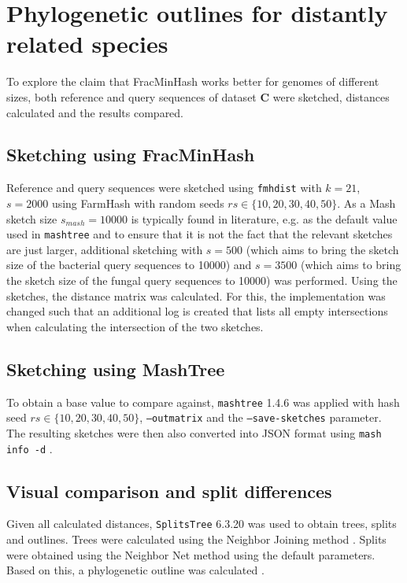 \section{Phylogenetic outlines for distantly related species}
To explore the claim that FracMinHash works better for genomes of different
sizes, both reference and query sequences of dataset \textbf{C} were sketched,
distances
calculated and the results compared. 

\subsection*{Sketching using FracMinHash}
\label{sec:intersectionlog}
Reference and query sequences were sketched using \texttt{fmhdist} with $k=21$,
$s=2000$ using FarmHash \cite{pikeFarmhash2014,ZeroAllocationHashing2022} with
random seeds $rs \in \{10, 20, 30, 40, 50\}$. As a Mash sketch size
$s_{mash}=10000$ is typically found in literature, e.g. as the default value
used in \texttt{mashtree}
\cite{katzMashtreeRapidComparison2019,ondovMashFastGenome2016} and to ensure
that it is not the fact that the relevant sketches are just larger, additional
sketching with $s=500$ (which aims to bring the sketch size of the bacterial
query sequences to 10000) and $s=3500$ (which aims to bring the sketch size of
the fungal query sequences to 10000) was performed. Using the sketches, the
distance matrix was calculated. For this, the implementation was changed such
that an additional log is created that lists all empty intersections when
calculating the intersection of the two sketches.

\subsection*{Sketching using MashTree}
To obtain a base value to compare against, \texttt{mashtree} 1.4.6
\cite{katzMashtreeRapidComparison2019,ondovMashFastGenome2016} was applied with
hash seed $rs \in \{10, 20, 30, 40, 50\}$, \texttt{--outmatrix} and the
\texttt{--save-sketches} parameter. The resulting sketches were then also
converted into JSON format using \texttt{mash info -d}
\cite{ondovMashFastGenome2016}.

\subsection*{Visual comparison and split differences}
Given all calculated distances, \texttt{SplitsTree} 6.3.20
\cite{husonApplicationPhylogeneticNetworks2006} was used to obtain trees, splits
and outlines. Trees were calculated using the Neighbor Joining method
\cite{saitouNeighborjoiningMethodNew1987}. Splits were obtained using the
Neighbor Net method
\cite{bryantNeighborNetAgglomerativeMethod2004,bryantNeighborNetImprovedAlgorithms2023}
using the default parameters. Based on this, a phylogenetic outline was
calculated \cite{bagciMicrobialPhylogeneticContext2021}.

